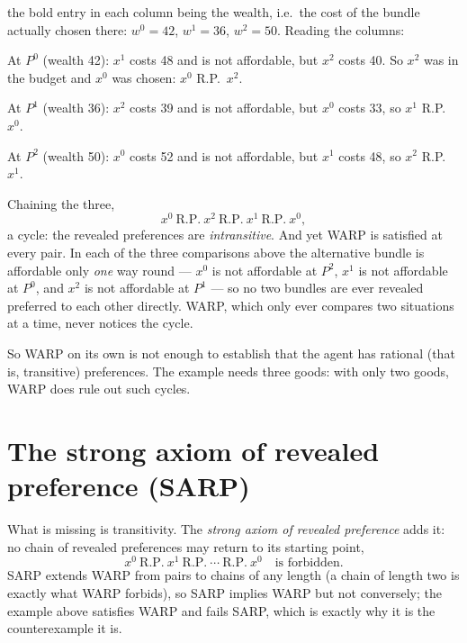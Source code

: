 \documentclass[11pt]{article}
\begin{document}
\noindent
the bold entry in each column being the wealth, i.e.\ the cost of the bundle actually
chosen there: $w^{0}=42$, $w^{1}=36$, $w^{2}=50$. Reading the columns:

\begin{flatlist}
  \item At $P^{0}$ (wealth 42): $x^{1}$ costs 48 and is not affordable, but $x^{2}$
        costs 40. So $x^{2}$ was in the budget and $x^{0}$ was chosen:
        $x^{0}$ R.P.\ $x^{2}$.
  \item At $P^{1}$ (wealth 36): $x^{2}$ costs 39 and is not affordable, but $x^{0}$
        costs 33, so $x^{1}$ R.P.\ $x^{0}$.
  \item At $P^{2}$ (wealth 50): $x^{0}$ costs 52 and is not affordable, but $x^{1}$
        costs 48, so $x^{2}$ R.P.\ $x^{1}$.
\end{flatlist}

Chaining the three,
\[ x^{0}\ \text{R.P.}\ x^{2}\ \text{R.P.}\ x^{1}\ \text{R.P.}\ x^{0}, \]
a cycle: the revealed preferences are \emph{intransitive}. And yet WARP is satisfied
at every pair. In each of the three comparisons above the alternative bundle is
affordable only \emph{one} way round --- $x^{0}$ is not affordable at $P^{2}$, $x^{1}$
is not affordable at $P^{0}$, and $x^{2}$ is not affordable at $P^{1}$ --- so no two
bundles are ever revealed preferred to each other directly. WARP, which only ever
compares two situations at a time, never notices the cycle.

So WARP on its own is not enough to establish that the agent has rational (that is,
transitive) preferences. The example needs three goods: with only two goods, WARP
does rule out such cycles.

\section{The strong axiom of revealed preference (SARP)}

What is missing is transitivity. The \emph{strong axiom of revealed preference} adds
it: no chain of revealed preferences may return to its starting point,
\[ x^{0}\ \text{R.P.}\ x^{1}\ \text{R.P.}\ \cdots\ \text{R.P.}\ x^{0}
   \quad\text{is forbidden.} \]
SARP extends WARP from pairs to chains of any length (a chain of length two is
exactly what WARP forbids), so SARP implies WARP but not conversely; the example above
satisfies WARP and fails SARP, which is exactly why it is the counterexample it is.
\end{document}
